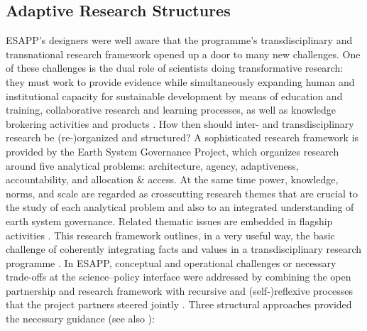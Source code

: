 \documentclass[10pt,a4paper]{article}
\begin{document}
\begin{multicols}{2}

\subsection{Adaptive Research Structures}
\noindent ESAPP’s designers were well aware that the programme's transdisciplinary and transnational research framework opened up a door to many new challenges. One of these challenges is the dual role of scientists doing transformative research: they must work to provide evidence while simultaneously expanding human and institutional capacity for sustainable development by means of education and training, collaborative research and learning processes, as well as knowledge brokering activities and products \citep{r30, r51, r54, r67}. How then should inter- and transdisciplinary research be (re-)organized and structured? A sophisticated research framework is provided by the Earth System Governance Project, which organizes research around five analytical problems: architecture, agency, adaptiveness, accountability, and allocation \& access. At the same time power, knowledge, norms, and scale are regarded as crosscutting research themes that are crucial to the study of each analytical problem and also to an integrated understanding of earth system governance. Related thematic issues are embedded in flagship activities \citep{r37}. This research framework outlines, in a very useful way, the basic challenge of coherently integrating facts and values in a transdisciplinary research programme \citep{r37, r41}. In ESAPP, conceptual and operational challenges or necessary trade-offs at the science–policy interface were addressed by combining the open partnership and research framework with recursive and (self-)reflexive processes that the project partners steered jointly \citep{r39}. Three structural approaches provided the necessary guidance (see also \citep{r59}):


\end{multicols}
\end{document}
